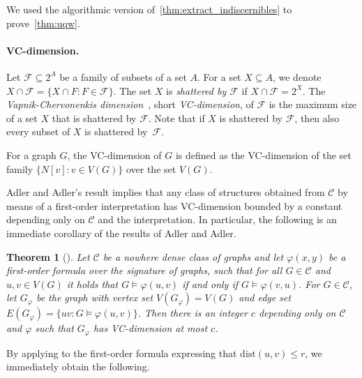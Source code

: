 \documentclass[11pt, fleqn]{article}
\theoremstyle{plain}
\newtheorem{theorem}{Theorem}
\theoremstyle{nonumberplain}
\newcommand{\CCC}{\mathcal{C}}
\newcommand{\FFF}{\mathcal{F}}
\newcommand{\N}{\mathbb{N}}
\renewcommand{\phi}{\varphi}
\newcommand{\dist}{\mathrm{dist}}
\begin{document}
We used the algorithmic version of~\cref{thm:extract_indiscernibles} 
to prove~\cref{thm:uqw}.

\paragraph{VC-dimension.}

Let $\FFF\subseteq 2^A$ be a family of
subsets of a set $A$. For a set $X\subseteq A$, we denote $X\cap \FFF=\{X\cap F : F\in \FFF\}$.
The set $X$ is \emph{shattered by $\FFF$} if $X\cap \FFF=2^X$.
The \emph{Vapnik-Chervonenkis dimension}~\cite{chervonenkis1971theory}, 
short \emph{VC-dimension},
of $\FFF$ is the maximum size of a set $X$ that is shattered by
$\FFF$. Note that if $X$ is shattered by $\FFF$, then also every
subset of $X$ is shattered by~$\FFF$.

For a graph $G$, the VC-dimension of $G$ is defined as the VC-dimension
of the set family $\{N[v]\colon v\in V(G)\}$ over the set $V(G)$.

Adler and Adler's result implies that any class of structures
obtained from $\CCC$ by means of a first-order interpretation has VC-dimension
bounded by a constant depending only on $\CCC$ and the interpretation.
In particular, the following is an immediate corollary of the results of Adler and Adler.

\begin{theorem}[\cite{adler2014interpreting}]\label{thm:adler}
  Let $\CCC$ be a nowhere dense class of graphs and let $\phi(x,y)$ be
  a first-order formula over the signature of graphs,
  such that for all $G \in \CCC$ and $u,v\in
  V(G)$ it holds that $G\models\phi(u,v)$ if and only if $G\models\phi(v,u)$. 
  For $G\in \CCC$, let $G_\phi$ be the graph with
  vertex set $V(G_\phi)=V(G)$ and edge set $E(G_\phi)=\{uv \colon
  G\models\phi(u,v)\}$. Then there is an integer $c$ depending only on
  $\CCC$ and $\phi$ such that $G_\phi$ has VC-dimension at most $c$.
\end{theorem}

By applying  to the first-order formula 
expressing that $\dist(u,v)\leq r$,
we immediately obtain the following.

\end{document}
